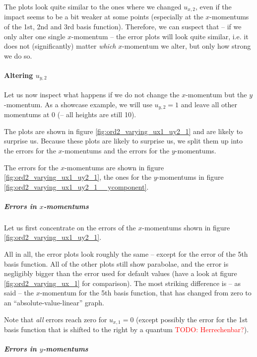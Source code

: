 \documentclass{article}
\newcommand{\todo}[1]{\textcolor{red}{TODO: #1}}
\begin{document}


The plots look quite similar to the ones where we changed $u_{x,2}$, even if the impact seems to be a bit weaker at some points (especially at the $x$-momentums of the 1st, 2nd and 3rd basis function). Therefore, we can suspect that -- if we only alter one single $x$-momentum -- the error plots will look quite similar, i.e. it does not (significantly) matter \emph{which} $x$-momentum we alter, but only how strong we do so.

\paragraph{Altering $u_{y,2}$}

Let us now inspect what happens if we do not change the $x$-momentum but the $y$-momentum. As a showcase example, we will use $u_{y,2}=1$ and leave all other momentums at 0 (-- all heights are still 10). 

The plots are shown in figure \ref{fig:ord2_varying_ux1_uy2_1} and are likely to surprise us. Because these plots are likely to surprise us, we split them up into the errors for the $x$-momentums and the errors for the $y$-momentums.

The errors for the $x$-momentums are shown in figure \ref{fig:ord2_varying_ux1_uy2_1}, the ones for the $y$-momentums in figure \ref{fig:ord2_varying_ux1_uy2_1__ycomponent}.

\subparagraph{Errors in $x$-momentums}

Let us first concentrate on the errors of the $x$-momentums shown in figure \ref{fig:ord2_varying_ux1_uy2_1}.



All in all, the error plots look roughly the same -- except for the error of the 5th basis function. All of the other plots still show parabolae, and the error is negligibly bigger than the error used for default values (have a look at figure \ref{fig:ord2_varying_ux_1} for comparison). The most striking difference is -- as said -- the $x$-momentum for the 5th basis function, that has changed from zero to an ``absolute-value-linear'' graph.

Note that \emph{all} errors reach zero for $u_{x,1}=0$ (except possibly the error for the 1st basis function that is shifted to the right by a quantum \todo{Herrechenbar?}).

\subparagraph{Errors in $y$-momentums}
\end{document}
